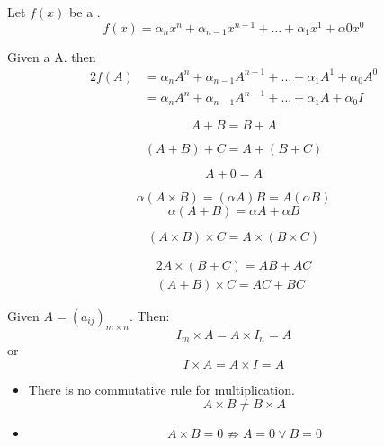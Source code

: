     \par Let $f(x)$ be a .
    \[
      f(x) = \alpha_{n}x^{n} + \alpha_{n - 1}x^{n - 1}
        + \ldots + \alpha_{1}x^{1} + \alpha{0}x^{0}
    \]
    \par Given a  A. then
    \begin{alignat*}{2}
      f(A) &= \alpha_{n}A^{n} + \alpha_{n - 1}A^{n - 1}
        + \ldots + \alpha_{1}A^{1} + \alpha_{0}A^{0} \\
      &= \alpha_{n}A^{n} + \alpha_{n - 1}A^{n - 1}
        + \ldots + \alpha_{1}A + \alpha_{0}I
    \end{alignat*}

      \[
        A + B = B + A
      \]

      \[
        (A + B) + C = A + (B + C)
      \]

      \[
        A + 0 = A
      \]

  \hiiEND

      \[
        \alpha (A \times B) = (\alpha A) B = A (\alpha B)
      \]
      \[
        \alpha (A + B) = \alpha A + \alpha B
      \]
  \hiiEND

      \[
        (A \times B) \times C = A \times (B \times C)
      \]

      \begin{alignat*}{2}
        A \times (B + C) = AB + AC \\
        (A + B) \times C = AC + BC
      \end{alignat*}

      \par Given $A = (a_{ij})_{m \times n}$. Then:
      \[
        I_{m} \times A = A \times I_{n} = A
      \]
      or
      \[
        I \times A = A \times I = A
      \]

      \begin{itemize}
        \item There is no commutative rule for multiplication.
          \[
            A \times B \neq B \times A
          \]
        \item
          \[
            A \times B = 0 \not \Rightarrow A = 0 \lor B = 0
          \]
      \end{itemize}

